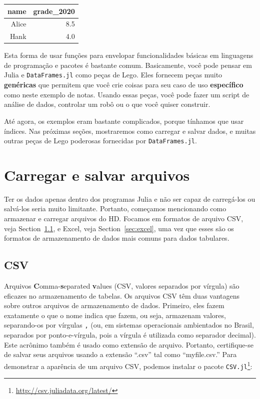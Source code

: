 \documentclass[
  notoc %
]{tufte-book}
\DeclareRobustCommand{\href}[2]{#2\footnote{\url{#1}}}
\newcommand{\passthrough}[1]{#1}
\begin{document}
\begin{longtable}[]{@{}rr@{}}
\toprule
name & grade\_2020 \\
\midrule
\endhead
Alice & 8.5 \\
Hank & 4.0 \\
\bottomrule
\end{longtable}

Esta forma de usar funções para envelopar funcionalidades básicas em
linguagens de programação e pacotes é bastante comum. Basicamente, você
pode pensar em Julia e \passthrough{\lstinline!DataFrames.jl!} como
peças de Lego. Eles fornecem peças muito \textbf{genéricas} que permitem
que você crie coisas para seu caso de uso \textbf{específico} como neste
exemplo de notas. Usando essas peças, você pode fazer um script de
análise de dados, controlar um robô ou o que você quiser construir.

Até agora, os exemplos eram bastante complicados, porque tínhamos que
usar índices. Nas próximas seções, mostraremos como carregar e salvar
dados, e muitas outras peças de Lego poderosas fornecidas por
\passthrough{\lstinline!DataFrames.jl!}.

\hypertarget{sec:load_save}{%
\section{Carregar e salvar arquivos}\label{sec:load_save}}

Ter os dados apenas dentro dos programas Julia e não ser capaz de
carregá-los ou salvá-los seria muito limitante. Portanto, começamos
mencionando como armazenar e carregar arquivos do HD. Focamos em
formatos de arquivo CSV, veja Section~\ref{sec:csv}, e Excel, veja
Section~\ref{sec:excel}, uma vez que esses são os formatos de
armazenamento de dados mais comuns para dados tabulares.

\hypertarget{sec:csv}{%
\subsection{CSV}\label{sec:csv}}

Arquivos \textbf{C}omma-\textbf{s}eparated \textbf{v}alues (CSV, valores
separados por vírgula) são eficazes no armazenamento de tabelas. Os
arquivos CSV têm duas vantagens sobre outros arquivos de armazenamento
de dados. Primeiro, eles fazem exatamente o que o nome indica que fazem,
ou seja, armazenam valores, separando-os por vírgulas
\passthrough{\lstinline!,!} (ou, em sistemas operacionais ambientados no
Brasil, separados por ponto-e-vírgula, pois a vírgula é utilizada como
separador decimal). Este acrônimo também é usado como extensão de
arquivo. Portanto, certifique-se de salvar seus arquivos usando a
extensão ``.csv'' tal como ``myfile.csv.'' Para demonstrar a aparência
de um arquivo CSV, podemos instalar o pacote
\href{http://csv.juliadata.org/latest/}{\passthrough{\lstinline!CSV.jl!}}:
\end{document}
